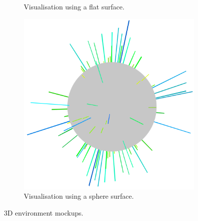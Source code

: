 
\begin{figure}[H]
    \newcommand{\figurewidth}{0.5\textwidth}
    \newcommand{\figureheight}{3cm}
	\begin{subfigure}[b]{\figurewidth}
        \centering
        \caption{Visualisation using a flat surface.}
        \label{fig:visualisation_flat}
    \end{subfigure}
    \begin{subfigure}[b]{\figurewidth}
        \centering
        \includegraphics[width=\textwidth]{images/design/mockups/sphere}
        \caption{Visualisation using a sphere surface.}
        \label{fig:visualisation_sphere}
    \end{subfigure}
	\caption[3D environment mockups]{3D environment mockups.}
	\label{fig:environment_mockups}
\end{figure}
